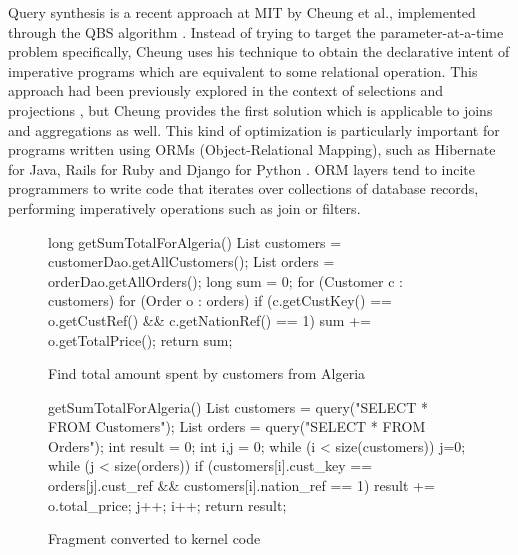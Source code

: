 Query synthesis is a recent approach at MIT by Cheung  et al., implemented through the QBS algorithm \cite{alvin-cheung:2013aa,alvin-cheung:2013ab}. Instead of trying to target the parameter-at-a-time problem specifically, Cheung uses his technique to obtain the declarative intent of imperative programs which are equivalent to some relational operation. This approach had been previously explored in the context of selections and projections \cite{wiedermann:2008aa}, but Cheung provides the first solution which is applicable to joins and aggregations as well. This kind of optimization is particularly important for programs written using ORMs (Object-Relational Mapping), such as Hibernate \cite{hibernate} for Java, Rails for Ruby \cite{rails} and Django for Python \cite{django}. ORM layers tend to incite programmers to write code that iterates over collections of database records, performing imperatively operations such as join or filters. 

\begin{figure*}[h]
\begin{minipage}{0.45\textwidth}
\centering
\begin{Java}[basicstyle=\small]
long getSumTotalForAlgeria() {
  List customers = customerDao.getAllCustomers();
  List orders = orderDao.getAllOrders();
  long sum = 0;
  for (Customer c : customers)
    for (Order o : orders)
      if (c.getCustKey() == o.getCustRef()
          && c.getNationRef() == 1)
        sum += o.getTotalPrice();
  return sum;
}
\end{Java}
\caption{Find total amount spent by customers from Algeria}
\label{fig:algeria-initial}
\end{minipage}\hfill
\begin{minipage}{0.45\textwidth}
\centering
\begin{Java}[basicstyle=\small]
getSumTotalForAlgeria() {
   List customers = query("SELECT * FROM Customers");
   List orders = query("SELECT * FROM Orders");
   int result = 0; int i,j = 0;
  while (i < size(customers)) { j=0;
    while (j < size(orders)) {
      if (customers[i].cust_key == orders[j].cust_ref && customers[i].nation_ref == 1)
         result += o.total_price;
     j++;
     }
   i++;
   }
   return result;
}
\end{Java}
\caption{Fragment converted to kernel code}
\label{fig:algeria-kernel}
\end{minipage}\hfill
\end{figure*}

